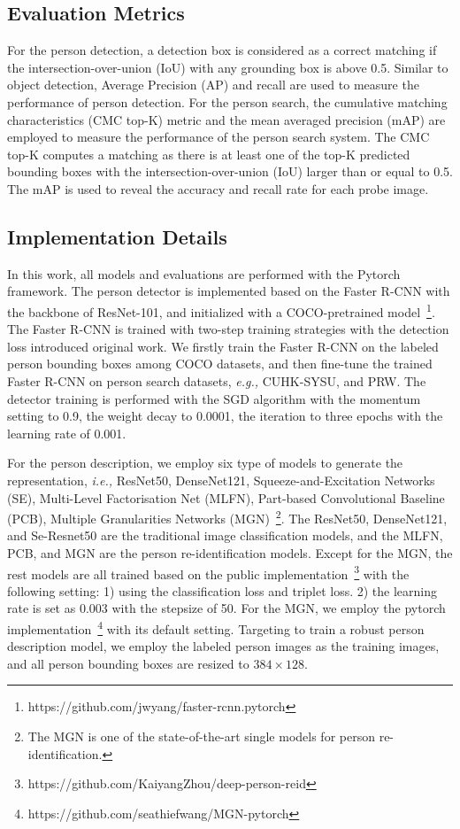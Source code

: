 \documentclass[journal]{IEEEtran}
\begin{document}
\subsection{Evaluation Metrics}
For the person detection, a detection box is considered as a correct matching if the intersection-over-union (IoU) with any grounding box is above 0.5. Similar to object detection, Average Precision (AP) and recall are used to measure the performance of person detection. For the person search, the cumulative matching characteristics (CMC top-K) metric and the mean averaged precision (mAP) are employed to measure the performance of the person search system. The CMC top-K computes a matching as there is at least one of the top-K predicted bounding boxes with the intersection-over-union (IoU) larger than or equal to 0.5. The mAP is used to reveal the accuracy and recall rate for each probe image.

\subsection{Implementation Details}
In this work, all models and evaluations are performed with the Pytorch framework. The person detector is implemented based on the Faster R-CNN with the backbone of ResNet-101, and initialized with a COCO-pretrained model~\footnote{https://github.com/jwyang/faster-rcnn.pytorch}. 
The Faster R-CNN is trained with two-step training strategies with the detection loss introduced original work. 
We firstly train the Faster R-CNN on the labeled person bounding boxes among COCO datasets, and then fine-tune the trained Faster R-CNN on person search datasets, \emph{e.g.,} CUHK-SYSU, and PRW. 
The detector training is performed with the SGD algorithm with the momentum setting to 0.9, the weight decay to 0.0001, the iteration to three epochs with the learning rate of 0.001.

For the person description, we employ six type of models to generate the representation, \emph{i.e.,} ResNet50\cite{HeZRS15}, DenseNet121\cite{HuangLMW17}, Squeeze-and-Excitation Networks (SE)\cite{HuSS18}, Multi-Level Factorisation Net (MLFN)\cite{ChangHX18}, Part-based Convolutional Baseline (PCB)\cite{SunZYTW18}, Multiple Granularities Networks (MGN)\cite{WangYCLZ18}~\footnote{The MGN is one of the state-of-the-art single models for person re-identification.}. 
The ResNet50, DenseNet121, and Se-Resnet50 are the traditional image classification models, and the MLFN, PCB, and MGN are the person re-identification models. 
Except for the MGN, the rest models are all trained based on the public implementation~\footnote{https://github.com/KaiyangZhou/deep-person-reid} with the following setting: 1) using the classification loss and triplet loss. 2) the learning rate is set as 0.003 with the stepsize of 50. For the MGN, we employ the pytorch implementation~\footnote{https://github.com/seathiefwang/MGN-pytorch} with its default setting. Targeting to train a robust person description model, we employ the labeled person images as the training images, and all person bounding boxes are resized to $384\times 128$.
\end{document}
